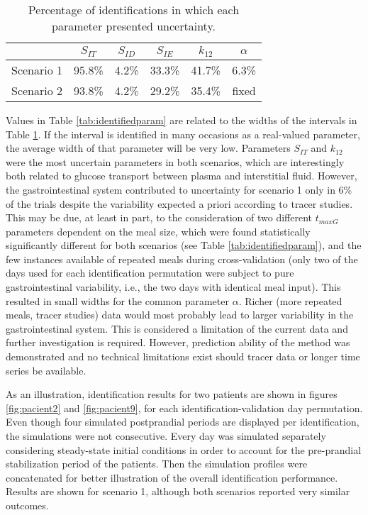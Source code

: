 \begin{table}[hbtp]
	\centering
	\begin{tabular}{ c | c  c  c  c  c }
   & $S_{IT}$ & $S_{ID}$ & $S_{IE}$ & $k_{12}$ & $\alpha$ \\
	\hline
	Scenario 1 & 95.8\% & 4.2\% & 33.3\% & 41.7\% & 6.3\% \\
	Scenario 2 & 93.8\% & 4.2\% & 29.2\% & 35.4\% & fixed \\
	\hline
	\end{tabular}
\caption{Percentage of identifications in which each parameter presented uncertainty.}
\label{tab:uncertaintyscenarios}
\end{table}

Values in Table \ref{tab:identifiedparam} are related to the widths of the intervals in Table \ref{tab:uncertaintyscenarios}. If the interval is identified in many occasions as a real-valued parameter, the average width of that parameter will be very low. Parameters $S_{IT}$ and $k_{12}$ were the most uncertain parameters in both scenarios, which are interestingly both related to glucose transport between plasma and interstitial fluid. However, the gastrointestinal system contributed to uncertainty for scenario 1 only in 6\% of the trials despite the variability expected a priori according to tracer studies. This may be due, at least in part, to the consideration of two different $t_{maxG}$ parameters dependent on the meal size, which were found statistically significantly different for both scenarios (see Table \ref{tab:identifiedparam}), and the few instances available of repeated meals during cross-validation (only two of the days used for each identification permutation were subject to pure gastrointestinal variability, i.e., the two days with identical meal input). This resulted in small widths for the common parameter $\alpha$. Richer (more repeated meals, tracer studies) data would most probably lead to larger variability in the gastrointestinal system. This is considered a limitation of the current data and further investigation is required. However, prediction ability of the method was demonstrated and no technical limitations exist should tracer data or longer time series be available.

As an illustration, identification results for two patients are shown in figures \ref{fig:pacient2} and \ref{fig:pacient9}, for each identification-validation day permutation. Even though four simulated postprandial periods are displayed per identification, the simulations were not consecutive. Every day was simulated separately considering steady-state initial conditions in order to account for the pre-prandial stabilization period of the patients. Then the simulation profiles were concatenated for better illustration of the overall identification performance. Results are shown for scenario 1, although both scenarios reported very similar outcomes.

